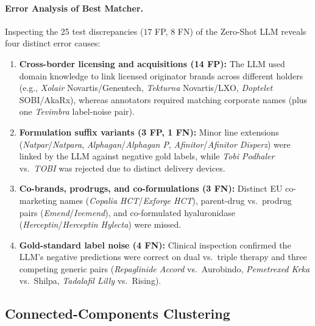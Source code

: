\documentclass{llncs}
\begin{document}
\paragraph{Error Analysis of Best Matcher.}
Inspecting the 25 test discrepancies ($17$ FP, $8$ FN) of the Zero-Shot LLM reveals four distinct error causes:
\begin{enumerate}
  \item \textbf{Cross-border licensing and acquisitions (14 FP):} The LLM used domain knowledge to link licensed originator brands across different holders (e.g., \textit{Xolair} Novartis/Genentech, \textit{Tekturna} Novartis/LXO, \textit{Doptelet} SOBI/AkaRx), whereas annotators required matching corporate names (plus one \textit{Tevimbra} label-noise pair).
  \item \textbf{Formulation suffix variants (3 FP, 1 FN):} Minor line extensions (\textit{Natpar}/\textit{Natpara}, \textit{Alphagan}/\textit{Alphagan P}, \textit{Afinitor}/\textit{Afinitor Disperz}) were linked by the LLM against negative gold labels, while \textit{Tobi Podhaler} vs.\ \textit{TOBI} was rejected due to distinct delivery devices.
  \item \textbf{Co-brands, prodrugs, and co-formulations (3 FN):} Distinct EU co-marketing names (\textit{Copalia HCT}/\textit{Exforge HCT}), parent-drug vs.\ prodrug pairs (\textit{Emend}/\textit{Ivemend}), and co-formulated hyaluronidase (\textit{Herceptin}/\textit{Herceptin Hylecta}) were missed.
  \item \textbf{Gold-standard label noise (4 FN):} Clinical inspection confirmed the LLM's negative predictions were correct on dual vs.\ triple therapy and three competing generic pairs (\textit{Repaglinide Accord} vs.\ Aurobindo, \textit{Pemetrexed Krka} vs.\ Shilpa, \textit{Tadalafil Lilly} vs.\ Rising).
\end{enumerate}

\subsection{Connected-Components Clustering}
\label{subsec:clustering}
\end{document}
